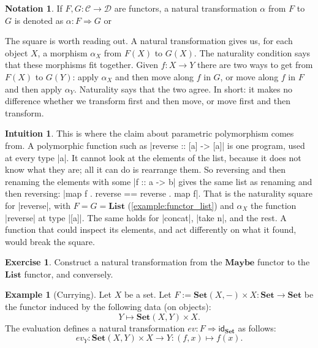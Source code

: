 \documentclass[a4paper,11pt, oneside,titlepage=false]{scrbook}
\theoremstyle{plain}
\theoremstyle{definition}
\newtheorem{exa}[thm]{Example}
\newtheorem{exer}[thm]{Exercise}
\newtheorem{intu}[thm]{Intuition}
\newtheorem{nota}[thm]{Notation}
\newcommand{\cfont}[1]{\ensuremath{\mathsf{#1}}}
\newcommand{\Cat}[1]{\mathcal{#1}}
\newcommand{\CC}{\Cat{C}}
\newcommand{\DD}{\Cat{D}}
\newcommand{\Catb}[1]{\mathbf{#1}}
\newcommand{\List}{\Catb{List}}
\newcommand{\Maybe}{\Catb{Maybe}}
\newcommand{\SET}{\Catb{Set}}
\newcommand{\Id}[1][]{\cfont{id}_{#1}}
\newcommand{\NatTrans}[3]{#1 : #2 \Rightarrow #3}
\begin{document}
\begin{nota} If $F,G:\CC\to\DD$ are functors, a natural transformation $\alpha$ from $F$ to $G$ is denoted as $\NatTrans{\alpha}{F}{G}$ or
\begin{center}
\end{center}
\end{nota}

The square is worth reading out.
A natural transformation gives us, for each object $X$, a morphism $\alpha_X$
from $F(X)$ to $G(X)$.
The naturality condition says that these morphisms fit together.
Given $f : X \to Y$ there are two ways to get from $F(X)$ to $G(Y)$: apply
$\alpha_X$ and then move along $f$ in $G$, or move along $f$ in $F$ and then
apply $\alpha_Y$.
Naturality says that the two agree.
In short: it makes no difference whether we transform first and then move, or
move first and then transform.

\begin{intu}
  This is where the claim about parametric polymorphism comes from.
  A polymorphic function such as |reverse :: [a] -> [a]| is one program, used
  at every type |a|.
  It cannot look at the elements of the list, because it does not know what
  they are; all it can do is rearrange them.
  So reversing and then renaming the elements with some |f :: a -> b| gives
  the same list as renaming and then reversing:
  |map f . reverse == reverse . map f|.
  That is the naturality square for |reverse|, with $F = G = \List$
  (\cref{example:functor_list}) and $\alpha_X$ the function |reverse| at type
  |[a]|.
  The same holds for |concat|, |take n|, and the rest.
  A function that could inspect its elements, and act differently on what it
  found, would break the square.
\end{intu}

\begin{exer}
Construct a natural transformation from the $\Maybe$ functor to the $\List$ functor, and conversely.
\end{exer}

\begin{exa}[Currying]\label{exa:currying} Let $X$ be a set. Let $F := \SET(X, -)\times X : \SET\to\SET$ be the functor induced by the following data (on objects):
\[
Y\mapsto \SET(X,Y)\times X.
\]
The evaluation defines a natural transformation $\NatTrans{ev}{F}{\Id[\SET]}$ as follows:
\[
ev_Y : \SET(X,Y) \times X \to Y : (f,x) \mapsto f(x).
\]
\end{exa}
\end{document}
